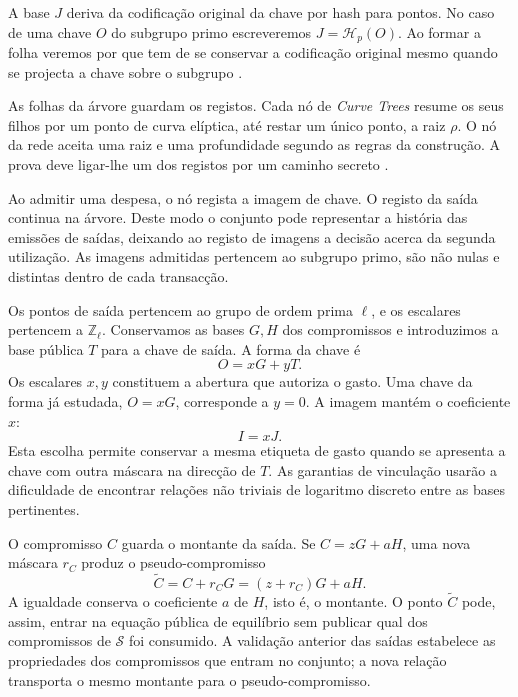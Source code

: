 A base \(J\) deriva da codificação original da chave por hash para
pontos. No caso de uma chave \(O\) do subgrupo primo escreveremos
\(J=\mathcal H_p(O)\). Ao formar a folha veremos por que tem de se
conservar a codificação original mesmo quando se projecta a chave
sobre o subgrupo \cite{monero-source-current-fcmp-tree}.

As folhas da árvore guardam os registos. Cada nó de \emph{Curve Trees}
resume os seus filhos por um ponto de curva elíptica, até restar um
único ponto, a raiz \(\rho\). O nó da rede aceita uma raiz e uma
profundidade segundo as regras da construção. A prova deve ligar-lhe
um dos registos por um caminho secreto \cite{curve-trees}.

Ao admitir uma despesa, o nó regista a imagem de chave. O registo da
saída continua na árvore. Deste modo o conjunto pode representar a
história das emissões de saídas, deixando ao registo de imagens a
decisão acerca da segunda utilização. As imagens admitidas pertencem
ao subgrupo primo, são não nulas e distintas dentro de cada transacção.


Os pontos de saída pertencem ao grupo de ordem prima \(\ell\),
e os escalares pertencem a \(\mathbb Z_\ell\). Conservamos as
bases \(G,H\) dos compromissos e introduzimos a base pública
\(T\) para a chave de saída. A forma da chave é
\[
 O=xG+yT.
\]
Os escalares \(x,y\) constituem a abertura que autoriza o gasto.
Uma chave da forma já estudada, \(O=xG\), corresponde a \(y=0\).
A imagem mantém o coeficiente \(x\):
\[
 I=xJ.
\]
Esta escolha permite conservar a mesma etiqueta de gasto quando se
apresenta a chave com outra máscara na direcção de \(T\). As
garantias de vinculação usarão a dificuldade de encontrar relações
não triviais de logaritmo discreto entre as bases pertinentes.

O compromisso \(C\) guarda o montante da saída. Se
\(C=zG+aH\), uma nova máscara \(r_C\) produz o
pseudo-compromisso
\[
 \widetilde C=C+r_CG=(z+r_C)G+aH.
\]
A igualdade conserva o coeficiente \(a\) de \(H\), isto é, o
montante. O ponto \(\widetilde C\) pode, assim, entrar na equação
pública de equilíbrio sem publicar qual dos compromissos de
\(\mathcal S\) foi consumido. A validação anterior das saídas
estabelece as propriedades dos compromissos que entram no conjunto;
a nova relação transporta o mesmo montante para o pseudo-compromisso.

